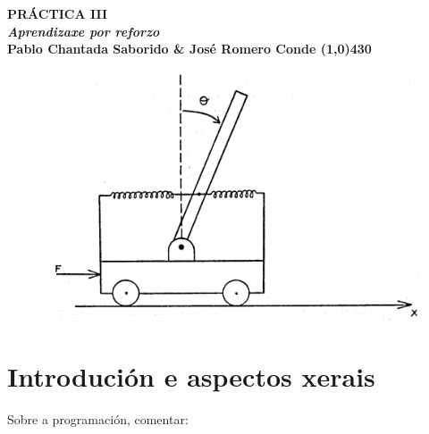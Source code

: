 \documentclass{article}
\begin{document}
\begin{center}
    \LARGE\bfseries PRÁCTICA III \\
    \large \emph{Aprendizaxe por reforzo} \\
    \small Pablo Chantada Saborido \& José Romero Conde
    \line(1,0){430}
\end{center}

\vspace{200}
\begin{figure}[h]
    \centering
    \includegraphics[width=1\linewidth]{portada.png}
    
    \label{fig:enter-label}
\end{figure}

\thispagestyle{empty}
\newpage

\section{Introdución e aspectos xerais}

Sobre a programación, comentar:
\end{document}
